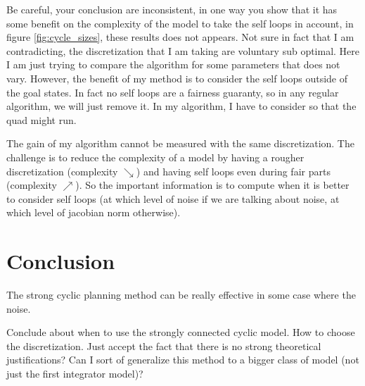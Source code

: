 Be careful, your conclusion are inconsistent, in one way you show that it has some benefit on the complexity of the model to take the self loops in account, in figure \ref{fig:cycle_sizes}, these results does not appears. Not sure in fact that I am contradicting, the discretization that I am taking are voluntary sub optimal. Here I am just trying to compare the algorithm for some parameters that does not vary. However, the benefit of my method is to consider the self loops outside of the goal states. In fact no self loops are a fairness guaranty, so in any regular algorithm, we will just remove it. In my algorithm, I have to consider so that the quad might run.

The gain of my algorithm cannot be measured with the same discretization. The challenge is to reduce the complexity of a model by having a rougher discretization (complexity $\searrow$) and having self loops even during fair parts (complexity $\nearrow$). So the important information is to compute when it is better to consider self loops (at which level of noise if we are talking about noise, at which level of jacobian norm otherwise).

\section{Conclusion}
The strong cyclic planning method can be really effective in some case where the noise.

Conclude about when to use the strongly connected cyclic model.
How to choose the discretization.
Just accept the fact that there is no strong theoretical justifications?
Can I sort of generalize this method to a bigger class of model (not just the first integrator model)?

